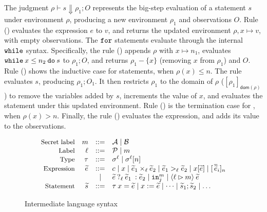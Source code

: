 The judgment $\rho \vdash s \Downarrow \rho_{1}; O$ represents the
big-step evaluation of a statement $s$ under environment $\rho$,
producing a new environment $\rho_{1}$ and observations $O$. Rule
({}) evaluates the expression $e$ to $v$, and returns the
updated environment $\rho,x \mapsto v$, with empty observations. The
${\mathtt{for}}$ statements evaluate
through the internal ${\mathtt{while}}$ syntax. Specifically, the rule
({}) appends $\rho$ with $x\mapsto n_{1}$,
evaluates ${\mathtt{while}}\:{x} \leq {n_{2}}\:{\mathtt{do}}\:{s}$ to $\rho_{1}; O$, and returns
$\rho_{1} - \{x\}$ (removing $x$ from $\rho_{1}$) and $O$. Rule
({}) shows the inductive case for 
statements, when $\rho(x) \leq n$. The rule evaluates $s$, producing
$\rho_{1}; O_{1}$. It then restricts $\rho_{1}$ to the domain of
$\rho$ ($[\rho_{1}]_{\mathsf{dom}(\rho)}$) to remove the variables
added by $s$, increments the value of $x$, and evaluates the
 statement under this updated environment. Rule
({}) is the termination case for ,
when $\rho(x) > n$. Finally, the rule ({}) evaluates the
expression, and adds its value to the observations.

\newcommand{\lcond}[4]{\ensuremath{{{#2}\:?_{{#1}}\:{#3}\::{#4}}}}
\begin{figure}[htp]
  \footnotesize
  \[
  \begin{array}{rrcl}
    \ftext{Secret label} & m &::=& \mathcal{A} \mid \mathcal{B}\\
    \ftext{Label} & \ell &::=& \mathcal{P} \mid m\\
    \ftext{Type} & \tau &::=& \sigma^{\ell} \mid \sigma^{\ell}[n]\\
    \ftext{Expression} & \widetilde{e} &::=& c \mid x \mid \widetilde{e}_{1} \mulop_{\ell} \widetilde{e}_{2} \mid \widetilde{e}_{1} >_{\ell} \widetilde{e}_{2} \mid x[\widetilde{e}] \mid [\,\overline{\widetilde{e}}_{i}]_{n} \\
    & & \mid & \lcond{\ell}{{\widetilde{e}}}{{\widetilde{e}}_{1}}{{\widetilde{e}}_{2}} \mid \kw{in}^{m}_{j} \mid \langle \ell \rhd m \rangle\:\widetilde{e}\\
    \ftext{Statement} & \widetilde{s} &::=& \tau\:x = \widetilde{e} \mid x := \widetilde{e} \mid \dots \mid \widetilde{s}_{1}; \widetilde{s}_{2} \mid \dots\\
  \end{array}
  \]
\caption{Intermediate language syntax}
\label{fig:interlang}
\end{figure}

